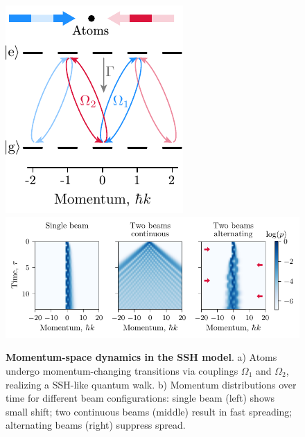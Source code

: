 
\begin{figure}[h]
    \centering
    \includegraphics{fig-ai/ssh-scheme.pdf}
    \hfill
    \includegraphics{fig-py/ssh-model.pdf}
    \caption{
        \textbf{Momentum-space dynamics in the SSH model}. 
        a) Atoms undergo momentum-changing transitions via couplings $\Omega_1$ and $\Omega_2$, realizing a SSH-like quantum walk.
        b) Momentum distributions over time for different beam configurations: single beam (left) shows small shift; two continuous beams (middle) result in fast spreading; alternating beams (right) suppress spread.
    }
    \label{fig:sshmodel}
\end{figure}


